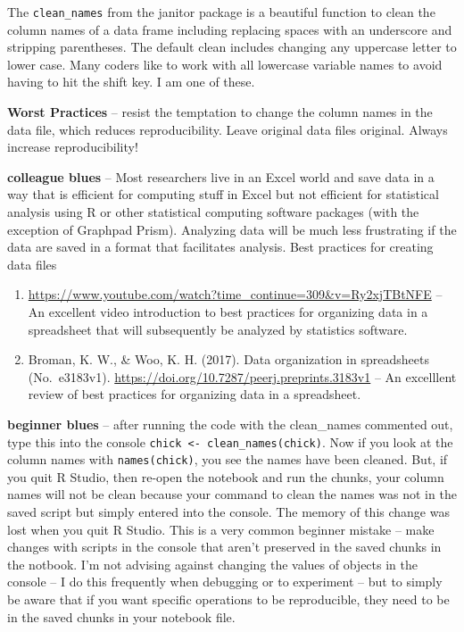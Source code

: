 \documentclass[]{book}
\begin{document}
The \texttt{clean\_names} from the janitor package is a beautiful function to clean the column names of a data frame including replacing spaces with an underscore and stripping parentheses. The default clean includes changing any uppercase letter to lower case. Many coders like to work with all lowercase variable names to avoid having to hit the shift key. I am one of these.

\textbf{Worst Practices} -- resist the temptation to change the column names in the data file, which reduces reproducibility. Leave original data files original. Always increase reproducibility!

\textbf{colleague blues} -- Most researchers live in an Excel world and save data in a way that is efficient for computing stuff in Excel but not efficient for statistical analysis using R or other statistical computing software packages (with the exception of Graphpad Prism). Analyzing data will be much less frustrating if the data are saved in a format that facilitates analysis. Best practices for creating data files

\begin{enumerate}
\def\labelenumi{\arabic{enumi}.}
\item
  \url{https://www.youtube.com/watch?time_continue=309\&v=Ry2xjTBtNFE} -- An excellent video introduction to best practices for organizing data in a spreadsheet that will subsequently be analyzed by statistics software.
\item
  Broman, K. W., \& Woo, K. H. (2017). Data organization in spreadsheets (No.~e3183v1). \url{https://doi.org/10.7287/peerj.preprints.3183v1} -- An excelllent review of best practices for organizing data in a spreadsheet.
\end{enumerate}

\textbf{beginner blues} -- after running the code with the clean\_names commented out, type this into the console \texttt{chick\ \textless{}-\ clean\_names(chick)}. Now if you look at the column names with \texttt{names(chick)}, you see the names have been cleaned. But, if you quit R Studio, then re-open the notebook and run the chunks, your column names will not be clean because your command to clean the names was not in the saved script but simply entered into the console. The memory of this change was lost when you quit R Studio. This is a very common beginner mistake -- make changes with scripts in the console that aren't preserved in the saved chunks in the notbook. I'm not advising against changing the values of objects in the console -- I do this frequently when debugging or to experiment -- but to simply be aware that if you want specific operations to be reproducible, they need to be in the saved chunks in your notebook file.
\end{document}
